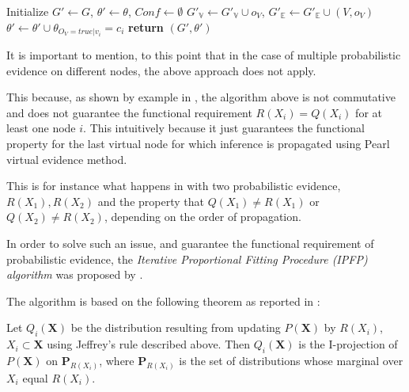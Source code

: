 \documentclass[11pt]{article}
\begin{document}
\begin{article}
\begin{algorithm*}[h!]
\begin{multicols}{2}
\begin{algorithmic}[1]
  \State Initialize $G'\leftarrow G$, $\theta'\leftarrow\theta$, $Conf \leftarrow \emptyset$
    
  \EndFor
    \State $G'_{\mathbb{V}}\leftarrow G'_{\mathbb{V}}\cup o_{V}$, $G'_{\mathbb{E}}\leftarrow G'_{\mathbb{E}}\cup(V,o_{V})$      
       
      \State $\theta'\leftarrow\theta'\cup\theta_{O_{V}=true|v_{i}}=c_{i}$ 
    \EndFor
  \EndFor
\State \textbf{return} $(G',\theta')$
\end{algorithmic}
\end{multicols}
\end{algorithm*}

It is important to mention, to this point that in the case of
multiple probabilistic evidence on different nodes, the above
approach does not apply.

This because, as shown by example in \cite{PENG_2010}, the algorithm
above is not commutative and does not guarantee the functional
requirement \(R(X_i) = Q(X_i)\) for at least one node \(i\). This
intuitively because it just guarantees the functional property for the last
virtual node for which inference is propagated using Pearl virtual
evidence method.

This is for instance what happens in \cite{PENG_2010} with two
probabilistic evidence, \(R(X_1), R(X_2)\) and the property that
\(Q(X_1) \neq R(X_1)\) or \(Q(X_2) \neq R(X_2)\), depending on the
order of propagation.

In order to solve such an issue, and guarantee the functional
requirement of probabilistic evidence, the \emph{Iterative Proportional
Fitting Procedure (IPFP) algorithm} was proposed by
\cite{Valtorta_2002}.

The algorithm is based on the following theorem as reported in
\cite{PENG_2010}:

\begin{theorem}\label{thm:two-I-projection}
Let $Q_i(\textbf{X})$ be the distribution resulting from updating $P(\textbf{X})$ by $R(X_i)$,
$X_i \subset \textbf{X}$ using Jeffrey’s rule described above. Then $Q_i(\textbf{X})$ is the I-projection of $P(\textbf{X})$ on
$\textbf{P}_{R(X_i)}$, where $\textbf{P}_{R(X_i)}$ is the set of distributions whose marginal over $X_i$ equal $R(X_i)$.
\end{theorem}


\end{article}
\end{document}
